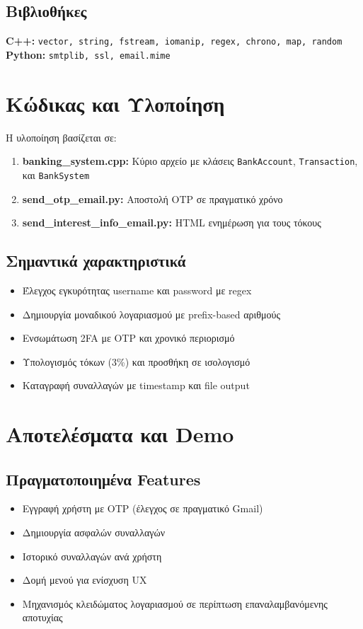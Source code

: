 \documentclass[a4paper,12pt]{article}
\begin{document}
\subsection*{Βιβλιοθήκες}
\textbf{C++:} \texttt{vector, string, fstream, iomanip, regex, chrono, map, random} \\ 
\textbf{Python:} \texttt{smtplib, ssl, email.mime} 

\section{Κώδικας και Υλοποίηση}
Η υλοποίηση βασίζεται σε:
\begin{enumerate}[label=\arabic*.]
    \item \textbf{banking\_system.cpp:} Κύριο αρχείο με κλάσεις \texttt{BankAccount}, \texttt{Transaction}, και \texttt{BankSystem}
    \item \textbf{send\_otp\_email.py:} Αποστολή OTP σε πραγματικό χρόνο
    \item \textbf{send\_interest\_info\_email.py:} HTML ενημέρωση για τους τόκους
\end{enumerate}

\subsection*{Σημαντικά χαρακτηριστικά}
\begin{itemize}[label=\textbullet]
    \item Έλεγχος εγκυρότητας username και password με regex
    \item Δημιουργία μοναδικού λογαριασμού με prefix-based αριθμούς
    \item Ενσωμάτωση 2FA με OTP και χρονικό περιορισμό
    \item Υπολογισμός τόκων (3\%) και προσθήκη σε ισολογισμό
    \item Καταγραφή συναλλαγών με timestamp και file output
\end{itemize}

\section{Αποτελέσματα και Demo}
\subsection*{Πραγματοποιημένα Features}
\begin{itemize}[label=\textbullet]
    \item Εγγραφή χρήστη με OTP (έλεγχος σε πραγματικό Gmail)
    \item Δημιουργία ασφαλών συναλλαγών
    \item Ιστορικό συναλλαγών ανά χρήστη
    \item Δομή μενού για ενίσχυση UX
    \item Μηχανισμός κλειδώματος λογαριασμού σε περίπτωση επαναλαμβανόμενης αποτυχίας
\end{itemize}
\end{document}
